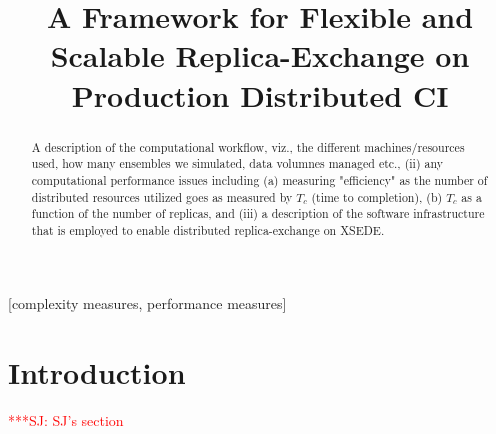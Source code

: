 \documentclass{sig-alternate}
\newcommand{\jhanote}[1]{ {\textcolor{red} { ***SJ: #1 }}}
\newcommand{\jhanote}[1]{}
\begin{document}

 \title{A Framework for Flexible and Scalable Replica-Exchange on
   Production Distributed CI}


\maketitle

\begin{abstract}

  A description of the computational workflow, viz., the different
  machines/resources used, how many ensembles we simulated, data
  volumnes managed etc., (ii) any computational performance issues
  including (a) measuring "efficiency" as the number of distributed
  resources utilized goes as measured by $T_c$ (time to completion),
  (b) $T_c$ as a function of the number of replicas, and (iii) a
  description of the software infrastructure that is employed to
  enable distributed replica-exchange on XSEDE.

\end{abstract}

[complexity measures, performance measures]



\section{Introduction}
\jhanote{SJ's section}
\end{document}
